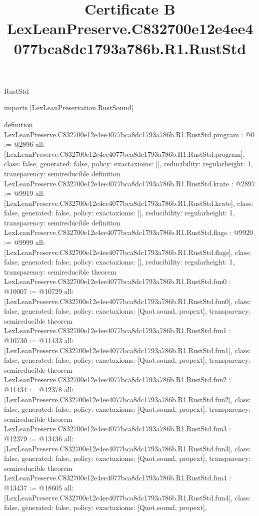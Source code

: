 \begin{lexlean}{RustStd}
\title{Certificate B LexLeanPreserve.C832700e12e4ee4077bca8dc1793a786b.R1.RustStd}
\begin{coremodule}
imports [LexLeanPreservation.RustSound]

definition LexLeanPreserve.C832700e12e4ee4077bca8dc1793a786b.R1.RustStd.program : @0 := @2896 {
  all: [LexLeanPreserve.C832700e12e4ee4077bca8dc1793a786b.R1.RustStd.program],
  class: false,
  generated: false,
  policy: exact{axioms: []},
  reducibility: regular{height: 1},
  transparency: semireducible
}
definition LexLeanPreserve.C832700e12e4ee4077bca8dc1793a786b.R1.RustStd.krate : @2897 := @9919 {
  all: [LexLeanPreserve.C832700e12e4ee4077bca8dc1793a786b.R1.RustStd.krate],
  class: false,
  generated: false,
  policy: exact{axioms: []},
  reducibility: regular{height: 1},
  transparency: semireducible
}
definition LexLeanPreserve.C832700e12e4ee4077bca8dc1793a786b.R1.RustStd.flags : @9920 := @9999 {
  all: [LexLeanPreserve.C832700e12e4ee4077bca8dc1793a786b.R1.RustStd.flags],
  class: false,
  generated: false,
  policy: exact{axioms: []},
  reducibility: regular{height: 1},
  transparency: semireducible
}
theorem LexLeanPreserve.C832700e12e4ee4077bca8dc1793a786b.R1.RustStd.fun0 : @10007 := @10729 {
  all: [LexLeanPreserve.C832700e12e4ee4077bca8dc1793a786b.R1.RustStd.fun0],
  class: false,
  generated: false,
  policy: exact{axioms: [Quot.sound, propext]},
  transparency: semireducible
}
theorem LexLeanPreserve.C832700e12e4ee4077bca8dc1793a786b.R1.RustStd.fun1 : @10730 := @11433 {
  all: [LexLeanPreserve.C832700e12e4ee4077bca8dc1793a786b.R1.RustStd.fun1],
  class: false,
  generated: false,
  policy: exact{axioms: [Quot.sound, propext]},
  transparency: semireducible
}
theorem LexLeanPreserve.C832700e12e4ee4077bca8dc1793a786b.R1.RustStd.fun2 : @11434 := @12378 {
  all: [LexLeanPreserve.C832700e12e4ee4077bca8dc1793a786b.R1.RustStd.fun2],
  class: false,
  generated: false,
  policy: exact{axioms: [Quot.sound, propext]},
  transparency: semireducible
}
theorem LexLeanPreserve.C832700e12e4ee4077bca8dc1793a786b.R1.RustStd.fun3 : @12379 := @13436 {
  all: [LexLeanPreserve.C832700e12e4ee4077bca8dc1793a786b.R1.RustStd.fun3],
  class: false,
  generated: false,
  policy: exact{axioms: [Quot.sound, propext]},
  transparency: semireducible
}
theorem LexLeanPreserve.C832700e12e4ee4077bca8dc1793a786b.R1.RustStd.fun4 : @13437 := @18605 {
  all: [LexLeanPreserve.C832700e12e4ee4077bca8dc1793a786b.R1.RustStd.fun4],
  class: false,
  generated: false,
  policy: exact{axioms: [Quot.sound, propext]},
}
\end{coremodule}
\end{lexlean}
